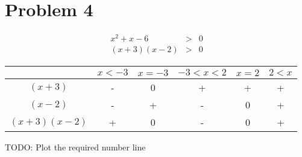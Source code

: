 \section*{Problem 4}
\begin{eqnarray*}
  x^2 + x - 6 & > & 0 \\
   (x+3)(x-2) & > & 0
\end{eqnarray*}

\begin{center}
  \begin{tabular}{ |c|c|c|c|c|c| }
    \hline
                     & $ x < -3 $ & $ x = -3 $ & $ -3 < x < 2 $ & $ x = 2 $ & $ 2 < x $ \\
    \hline
      $ (x+3) $      & -          & 0          & +              & +         & +         \\
    \hline
      $ (x-2) $      & -          & +          & -              & 0         & +         \\
    \hline
      $ (x+3)(x-2) $ & +          & 0          & -              & 0         & +         \\
    \hline
  \end{tabular}
\end{center}

TODO: Plot the required number line

